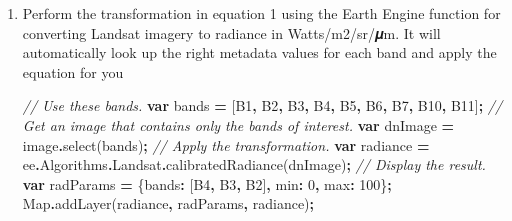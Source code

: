 \documentclass[
]{article}
\newenvironment{Shaded}{\begin{snugshade}}{\end{snugshade}}
\newcommand{\AttributeTok}[1]{\textcolor[rgb]{0.77,0.63,0.00}{#1}}
\newcommand{\BuiltInTok}[1]{#1}
\newcommand{\CommentTok}[1]{\textcolor[rgb]{0.56,0.35,0.01}{\textit{#1}}}
\newcommand{\DataTypeTok}[1]{\textcolor[rgb]{0.13,0.29,0.53}{#1}}
\newcommand{\DecValTok}[1]{\textcolor[rgb]{0.00,0.00,0.81}{#1}}
\newcommand{\FunctionTok}[1]{\textcolor[rgb]{0.00,0.00,0.00}{#1}}
\newcommand{\KeywordTok}[1]{\textcolor[rgb]{0.13,0.29,0.53}{\textbf{#1}}}
\newcommand{\NormalTok}[1]{#1}
\newcommand{\OperatorTok}[1]{\textcolor[rgb]{0.81,0.36,0.00}{\textbf{#1}}}
\newcommand{\StringTok}[1]{\textcolor[rgb]{0.31,0.60,0.02}{#1}}
\begin{document}
\begin{enumerate}
\def\labelenumi{\alph{enumi}.}
\item
  Perform the transformation in equation 1 using the Earth Engine function for converting Landsat imagery to radiance in Watts/m2/sr/𝝁m. It will automatically look up the right metadata values for each band and apply the equation for you

\begin{Shaded}
\begin{Highlighting}[]
\CommentTok{//  Use these bands.    }
\KeywordTok{var}\NormalTok{ bands }\OperatorTok{=}\NormalTok{ [}\StringTok{\textquotesingle{}B1\textquotesingle{}}\OperatorTok{,} \StringTok{\textquotesingle{}B2\textquotesingle{}}\OperatorTok{,} \StringTok{\textquotesingle{}B3\textquotesingle{}}\OperatorTok{,} \StringTok{\textquotesingle{}B4\textquotesingle{}}\OperatorTok{,} \StringTok{\textquotesingle{}B5\textquotesingle{}}\OperatorTok{,} \StringTok{\textquotesingle{}B6\textquotesingle{}}\OperatorTok{,} \StringTok{\textquotesingle{}B7\textquotesingle{}}\OperatorTok{,} \StringTok{\textquotesingle{}B10\textquotesingle{}}\OperatorTok{,} \StringTok{\textquotesingle{}B11\textquotesingle{}}\NormalTok{]}\OperatorTok{;}  
\CommentTok{// Get an image that  contains only the bands of interest.   }
\KeywordTok{var}\NormalTok{ dnImage }\OperatorTok{=}\NormalTok{ image}\OperatorTok{.}\FunctionTok{select}\NormalTok{(bands)}\OperatorTok{;}  
\CommentTok{// Apply the  transformation.   }
\KeywordTok{var}\NormalTok{ radiance }\OperatorTok{=}\NormalTok{  ee}\OperatorTok{.}\AttributeTok{Algorithms}\OperatorTok{.}\AttributeTok{Landsat}\OperatorTok{.}\FunctionTok{calibratedRadiance}\NormalTok{(dnImage)}\OperatorTok{;}  
\CommentTok{// Display the result.   }
\KeywordTok{var}\NormalTok{ radParams }\OperatorTok{=}\NormalTok{ \{}\DataTypeTok{bands}\OperatorTok{:}\NormalTok{ [}\StringTok{\textquotesingle{}B4\textquotesingle{}}\OperatorTok{,} \StringTok{\textquotesingle{}B3\textquotesingle{}}\OperatorTok{,} \StringTok{\textquotesingle{}B2\textquotesingle{}}\NormalTok{]}\OperatorTok{,} \DataTypeTok{min}\OperatorTok{:} \DecValTok{0}\OperatorTok{,} \DataTypeTok{max}\OperatorTok{:} \DecValTok{100}\NormalTok{\}}\OperatorTok{;}   
\BuiltInTok{Map}\OperatorTok{.}\FunctionTok{addLayer}\NormalTok{(radiance}\OperatorTok{,}\NormalTok{ radParams}\OperatorTok{,} \StringTok{\textquotesingle{}radiance\textquotesingle{}}\NormalTok{)}\OperatorTok{;}  
\end{Highlighting}
\end{Shaded}


\end{enumerate}
\end{document}
